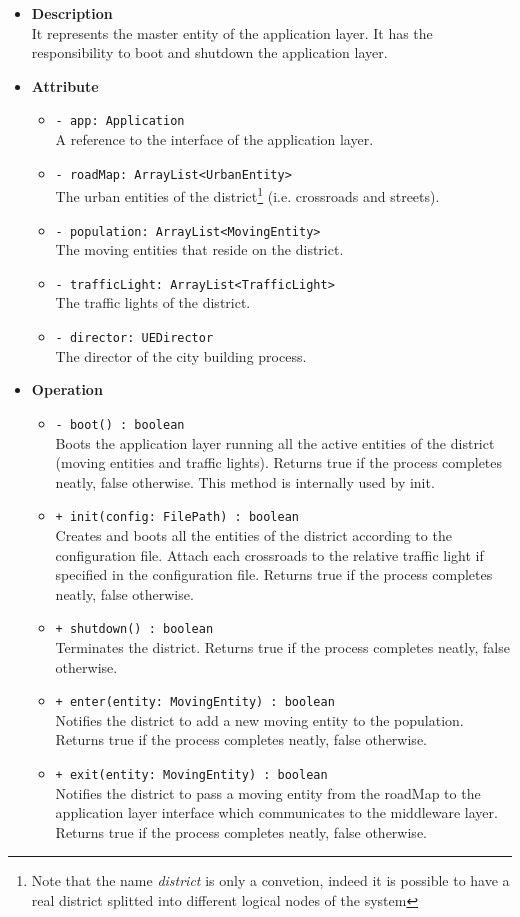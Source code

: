 \begin{itemize}
  \item \textbf{Description} \\
It represents the master entity of the application layer. 
It has the responsibility to boot and shutdown the application layer.
  \item \textbf{Attribute}
  \begin{itemize}
    \item \texttt{- app: Application} \\
A reference to the interface of the application layer.
    \item \texttt{- roadMap: ArrayList<UrbanEntity>} \\
The urban entities of the district\footnote{Note that the name 
\textit{district} is only a convetion, indeed it is possible to have a 
real district splitted into different logical nodes of the system}
(i.e. crossroads and streets). 
    \item \texttt{- population: ArrayList<MovingEntity>} \\
The moving entities that reside on the district.
    \item \texttt{- trafficLight: ArrayList<TrafficLight>} \\
The traffic lights of the district.
    \item \texttt{- director: UEDirector} \\ 
The director of the city building process.
  \end{itemize}
  \item \textbf{Operation}
  \begin{itemize} 
    \item \texttt{- boot() : boolean} \\
Boots the application layer running all the active entities of the 
district (moving entities and traffic lights).
Returns true if the process completes neatly, false otherwise. 
This method is internally used by init.
    \item \texttt{+ init(config: FilePath) : boolean} \\
Creates and boots all the entities of the district according to the 
configuration file. Attach each crossroads to the relative traffic light
if specified in the configuration file. 
Returns true if the process completes neatly, false otherwise.
    \item \texttt{+ shutdown() : boolean} \\
Terminates the district. Returns true if the process completes neatly,
false otherwise.
    \item \texttt{+ enter(entity: MovingEntity) : boolean} \\
Notifies the district to add a new moving entity to the population.
Returns true if the process completes neatly, false otherwise.
    \item \texttt{+ exit(entity: MovingEntity) : boolean} \\
Notifies the district to pass a moving entity from the roadMap to the 
application layer interface which communicates to the middleware layer.
Returns true if the process completes neatly, false otherwise.
  \end{itemize}
\end{itemize} 
